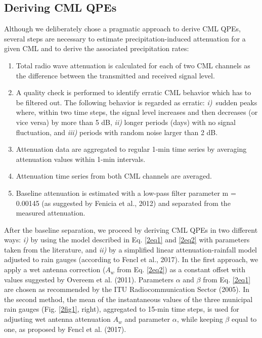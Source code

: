 \documentclass{ctuthesis}\usepackage[]{graphicx}\usepackage[]{color}
\begin{document}
\subsection{Deriving CML QPEs} \label{DerCML}

Although we deliberately chose a pragmatic approach to derive CML QPEs, several steps are necessary to estimate precipitation-induced attenuation for a given CML and to derive the associated precipitation rates:

\begin{enumerate}
        \item Total radio wave attenuation is calculated for each of two CML channels as the difference between the transmitted and received signal level. 
        \item A quality check is performed to identify erratic CML behavior which has to be filtered out. The following behavior is regarded as erratic: \emph{i)}~sudden peaks where, within two time steps, the signal level increases and then decreases (or vice versa) by more than 5 dB, \emph{ii)} longer periods (days) with no signal fluctuation, and \emph{iii)} periods with random noise larger than 2 dB. 
        \item Attenuation data are aggregated to regular 1-min time series by averaging attenuation values within 1-min intervals. 
        \item Attenuation time series from both CML channels are averaged. 
        \item Baseline attenuation is estimated with a low-pass filter parameter m = 0.00145 (as suggested by Fenicia et al., 2012) and separated from the measured attenuation.
\end{enumerate}

After the baseline separation, we proceed by deriving CML QPEs in two different ways: \emph{i)} by using the model described in Eq. \ref{2eq1} and \ref{2eq2} with parameters taken from the literature, and \emph{ii)} by a simplified linear attenuation-rainfall model adjusted to rain gauges (according to Fencl et al., 2017). In the first approach, we apply a wet antenna correction ($A_w$ from Eq. \ref{2eq2}) as a constant offset with values suggested by Overeem et al. (2011). Parameters $\alpha$ and $\beta$ from Eq. \ref{2eq1} are chosen as recommended by the ITU Radiocommunication Sector (2005). In the second method, the mean of the instantaneous values of the three municipal rain gauges (Fig. \ref{2fig1}, right), aggregated to 15-min time steps, is used for adjusting wet antenna attenuation $A_w$ and parameter $\alpha$, while keeping $\beta$ equal to one, as proposed by Fencl et al. (2017).
\end{document}
